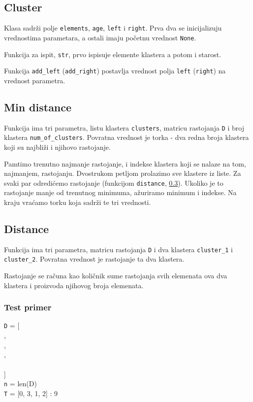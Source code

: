 \subsection{Cluster}
\label{cluster}

Klasa sadrži polje \texttt{elements}, \texttt{age}, \texttt{left} i \texttt{right}. Prva dva se inicijalizuju vrednostima parametara, a ostali imaju početnu vrednost \texttt{None}.

Funkcija za ispit, \texttt{str}, prvo ispisuje elemente klastera a potom i starost.

Funkcija \texttt{add\_left} (\texttt{add\_right}) postavlja vrednost polja \texttt{left} (\texttt{right}) na vrednost parametra.




\subsection{Min distance}
\label{minDistance}

Funkcija ima tri parametra, listu klastera \texttt{clusters}, matricu rastojanja \texttt{D} i broj klastera \texttt{num\_of\_clusters}. Povratna vrednost je torka - dva redna broja klastera koji su najbliži i njihovo rastojanje.

Pamtimo trenutno najmanje rastojanje, i indekse klastera koji se nalaze na tom, najmanjem, rastojanju. Dvostrukom petljom prolazimo sve klastere iz liste. Za svaki par odredićemo rastojanje (funkcijom \texttt{distance}, \ref{distance2}). Ukoliko je to rastojanje manje od trenutnog minimuma, ažuriramo minimum i indekse. Na kraju vraćamo torku koja sadrži te tri vrednosti.





\subsection{Distance}
\label{distance2}

Funkcija ima tri parametra, matricu rastojanja \texttt{D} i dva klastera \texttt{cluster\_1} i \texttt{cluster\_2}. Povratna vrednost je rastojanje ta dva klastera.

Rastojanje se računa kao količnik sume rastojanja svih elemenata ova dva klastera i proizvoda njihovog broja elemenata.




\subsubsection{Test primer}

\noindent \texttt{D} = [
\\\indent[0,  13, 21, 22],
\\\indent[13,  0, 12, 13],
\\\indent[21, 12,  0, 13],
\\\indent[22, 13, 13,  0]
\\]
\\\texttt{n} = len(D)
\\\texttt{T} = [0, 3, 1, 2] : 9

